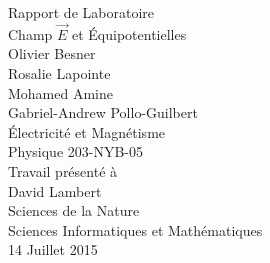 \begin{titlepage}
\begin{center}
	{\large Rapport de Laboratoire}\\
	{\huge Champ $\vec{E}$ et Équipotentielles}
	\\[38mm]
	Olivier Besner\\
	Rosalie Lapointe\\
	Mohamed Amine\\
	Gabriel-Andrew Pollo-Guilbert
	\\[38mm]
	Électricité et Magnétisme\\
	Physique 203-NYB-05
	\\[38mm]
	Travail présenté à\\
	David Lambert
	\\[38mm]
	Sciences de la Nature\\
	Sciences Informatiques et Mathématiques\\
	14 Juillet 2015\\
\end{center}
\end{titlepage}
